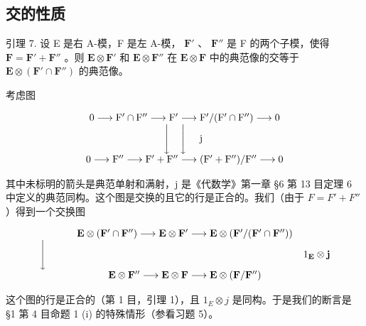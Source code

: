 \subsection{交的性质}

引理 7. 设 E 是右 A-模，F 是左 A-模， \(\mathbf{F}'\) 、 \(\mathbf{F}''\) 是 F 的两个子模，使得 \(\mathbf{F} = \mathbf{F}' + \mathbf{F}''\) 。则 \(\mathbf{E} \otimes \mathbf{F}'\) 和 \(\mathbf{E} \otimes \mathbf{F}''\) 在 \(\mathbf{E} \otimes \mathbf{F}\) 中的典范像的交等于 \(\mathbf{E} \otimes (\mathbf{F}' \cap \mathbf{F}'')\) 的典范像。

考虑图

\[
\begin{array}{c} 0 \longrightarrow \mathrm{F} ^ {\prime} \cap \mathrm{F} ^ {\prime \prime} \longrightarrow \mathrm{F} ^ {\prime} \longrightarrow \mathrm{F} ^ {\prime} / (\mathrm{F} ^ {\prime} \cap \mathrm{F} ^ {\prime \prime}) \longrightarrow 0 \\ \Biggl \downarrow \quad \Biggl \downarrow \quad \text {   j   } \\ 0 \longrightarrow \mathrm{F} ^ {\prime \prime} \longrightarrow \mathrm{F} ^ {\prime} + \mathrm{F} ^ {\prime \prime} \longrightarrow (\mathrm{F} ^ {\prime} + \mathrm{F} ^ {\prime \prime}) / \mathrm{F} ^ {\prime \prime} \longrightarrow 0 \end{array}
\]

其中未标明的箭头是典范单射和满射，j 是《代数学》第一章 §6 第 13 目定理 6 中定义的典范同构。这个图是交换的且它的行是正合的。我们（由于 \(F = F' + F''\) ）得到一个交换图

\[
\begin{array}{c} \mathbf {E} \otimes (\mathbf {F} ^ {\prime} \cap \mathbf {F} ^ {\prime \prime}) \longrightarrow \mathbf {E} \otimes \mathbf {F} ^ {\prime} \longrightarrow \mathbf {E} \otimes (\mathbf {F} ^ {\prime} / (\mathbf {F} ^ {\prime} \cap \mathbf {F} ^ {\prime \prime})) \\ \Biggl \downarrow \qquad \qquad \qquad \qquad \qquad \qquad \qquad \qquad \qquad \qquad \qquad \qquad \qquad 1 _ {\mathbf {E}} \otimes \mathbf {j} \\ \mathbf {E} \otimes \mathbf {F} ^ {\prime \prime} \longrightarrow \mathbf {E} \otimes \mathbf {F} \longrightarrow \mathbf {E} \otimes (\mathbf {F} / \mathbf {F} ^ {\prime \prime}) \end{array}
\]

这个图的行是正合的（第 1 目，引理 1），且 \(1_{E} \otimes j\) 是同构。于是我们的断言是 §1 第 4 目命题 1 (i) 的特殊情形（参看习题 5）。

